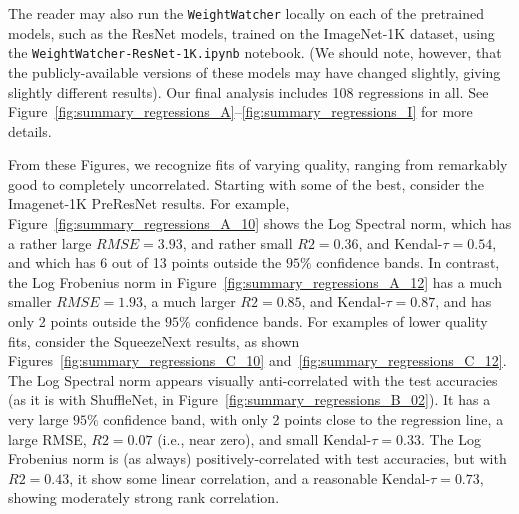 The reader may also run the  \texttt{WeightWatcher} locally on each of the 
pretrained models,
such as the ResNet models, trained on the ImageNet-1K dataset, using the \texttt{WeightWatcher-ResNet-1K.ipynb} notebook.
(We should note, however, that the publicly-available versions of these models may have changed slightly, giving slightly different results).
Our final analysis includes 108 regressions in all. %
See Figure~\ref{fig:summary_regressions_A}--\ref{fig:summary_regressions_I} for more details.


From these Figures, we recognize fits of varying quality, ranging from remarkably good to completely uncorrelated.
Starting with some of the best, consider the Imagenet-1K PreResNet results.  
For example,
Figure~\ref{fig:summary_regressions_A_10} shows the 
Log Spectral norm, %
which has a rather large $RMSE=3.93$, and rather small $R2=0.36$, and Kendal-$\tau=0.54$, and 
which has 6 out of 13 points outside the $95\%$ confidence bands.  
In contrast, the 
Log Frobenius norm %
in Figure~\ref{fig:summary_regressions_A_12}
has a much smaller $RMSE=1.93$, a much larger $R2=0.85$, and Kendal-$\tau=0.87$, and 
has only 2 points outside the $95\%$ confidence bands.
For examples of lower quality fits, consider the SqueezeNext results, as shown Figures~\ref{fig:summary_regressions_C_10} and~\ref{fig:summary_regressions_C_12}.  
The 
Log Spectral norm  %
appears visually anti-correlated with the test accuracies (as it is with ShuffleNet, in Figure~\ref{fig:summary_regressions_B_02}).
It has a very large $95\%$ confidence band, with only 2 points close to the regression line, a large RMSE, $R2=0.07$ (i.e., near zero), and small Kendal-$\tau=0.33$.  
The 
Log Frobenius norm %
is (as always) positively-correlated with test accuracies, but with $R2=0.43$, it show some linear correlation, and a reasonable Kendal-$\tau=0.73$, showing moderately strong rank correlation.

